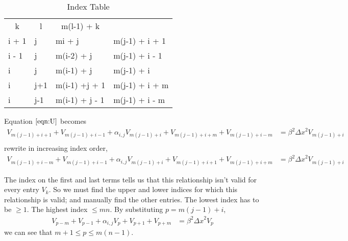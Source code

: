 \documentclass[letter]{article}
\begin{document}
	\begin{table}[h]
	\centering
	\caption{Index Table}
	\label{index_table}
	\begin{tabular}{llll}
	\multicolumn{1}{c}{k} & \multicolumn{1}{c}{l} & \multicolumn{1}{c}{m(l-1) + k}      & \multicolumn{1}{c}{} \\ \cline{1-3}
	i + 1                 & j                     & \multicolumn{1}{l|}{mi + j}			 	& m(j-1) + i + 1       \\
	i - 1                 & j                     & \multicolumn{1}{l|}{m(i-2) + j} 		& m(j-1) + i - 1       \\
	i                     & j                  	  & \multicolumn{1}{l|}{m(i-1) + j}     	& m(j-1) + i          \\
	i                     & j+1                   & \multicolumn{1}{l|}{m(i-1) +j + 1}      & m(j-1) + i + m\\
	i                     & j-1                   & \multicolumn{1}{l|}{m(i-1) + j - 1}     & m(j-1) + i - m  \\
	\end{tabular}
	\end{table}
	
	Equation $\ref{eqn:U}$ becomes\\
	\begin{align*}
		V_{m(j-1) + i + 1} + V_{ m(j-1) + i - 1} + \alpha_{i,j} V_{m(j-1) + i} + V_{m(j-1) + i + m} + V_{m(j-1) + i - m} &= \beta^2 {\Delta x}^2 V_{m(j-1) + i }\\
	\end{align*}
	rewrite in increasing index order,\\
	\begin{align}
		\label{eqn:V}
		V_{m(j-1) + i -m} + V_{ m(j-1) + i - 1} + \alpha_{i,j} V_{m(j-1) + i} + V_{m(j-1) + i + 1} + V_{m(j-1) + i + m} &= \beta^2 {\Delta x}^2 V_{m(j-1) + i }
	\end{align}
	
	The index on the first and last terms tells us that this relationship isn't valid for every entry $V_k$. So we must find the upper and lower indices for which this relationship is valid; and manually find the other entries. The lowest index has to be $\geq 1$. The highest index $\leq mn$. By substituting $p=m(j-1) + i$,\\
	\begin{align}
		V_{p - m} + V_{p - 1} + \alpha_{i,j} V_{p} + V_{p + 1} + V_{p + m} &= \beta^2 {\Delta x}^2 V_{p}
		\label{eqn:V_p}
	\end{align}
	we can see that $m+1 \leq p \leq m(n-1)$.\\
	
\end{document}
